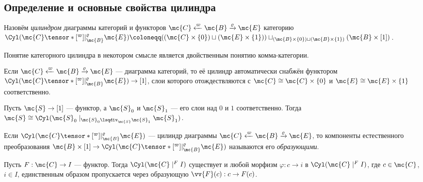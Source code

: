 \documentclass[
	extrafontsizes,
	11pt,
	hyphens,
]{memoir}
\begin{document}
\subsection{Определение и основные свойства цилиндра}

\begin{definition}
Назовём \emph{цилиндром} диаграммы категорий и функторов
\(\mc{C} \xleftarrow{\varpi} \mc{B} \xrightarrow{\varrho} \mc{E}\)
категорию
\(
\Cyl(\mc{C} \tensor*[^{\varpi}]{\mid}{^{\varrho}_{\mc{B}}} \mc{E})
\coloneqq
((\mc{C} \times \{0\}) \sqcup (\mc{E} \times \{1\}))
\sqcup_{(\mc{B} \times \{0\}) \sqcup (\mc{B} \times \{1\})}
(\mc{B} \times [1])
\).
\end{definition}

\begin{remark}
Понятие категорного цилиндра в некотором смысле является двойственным понятию комма-категории.
\end{remark}

\begin{observation}
Если \(\mc{C} \xleftarrow{\varpi} \mc{B} \xrightarrow{\varrho} \mc{E}\) --- диаграмма категорий, то её цилиндр автоматически снабжён функтором \(\Cyl(\mc{C} \tensor*[^{\varpi}]{\mid}{^{\varrho}_{\mc{B}}} \mc{E}) \to [1]\), слои которого отождествляются с \(\mc{C} \cong \mc{C} \times \{0\}\) и \(\mc{E} \cong \mc{E} \times \{1\}\) соответственно.
\end{observation}

\begin{observation}
Пусть \(\mc{S} \to [1]\) --- функтор, а \(\mc{S}_0\) и \(\mc{S}_1\) --- его слои над \(0\) и \(1\) соответственно. Тогда
\(\mc{S} \cong \Cyl(\mc{S}_0 \mid_{\mc{S}_0 \lsqdiv_{\mc{S}} \mc{S}_1} \mc{S}_1)\).
\end{observation}

\begin{definition}
Если \(\Cyl(\mc{C} \tensor*[^{\varpi}]{\mid}{^{\varrho}_{\mc{B}}} \mc{E})\) --- цилиндр диаграммы \(\mc{C} \xleftarrow{\varpi} \mc{B} \xrightarrow{\varrho} \mc{E}\),
то компоненты естественного преобразования
\(\mc{B} \times [1] \to \Cyl(\mc{C} \tensor*[^{\varpi}]{\mid}{^{\varrho}_{\mc{B}}} \mc{E})\)
называются его \emph{образующими}.
\end{definition}

\begin{observation}
Пусть \(F : \mc{C} \to I\) --- функтор.
Тогда \(\Cyl(\mc{C} \mid^F I)\) существует и любой морфизм \(\varphi : c \to i\) в \(\Cyl(\mc{C} \mid^F I)\), где \(c \in \mc{C}\), \(i \in I\), единственным образом пропускается через образующую \(\vv{F}(c) : c \to F(c)\).
\end{observation}
\end{document}
